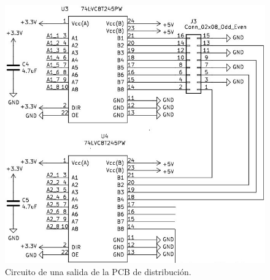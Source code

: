 \begin{figure}[htpb]
	\centering
    \includegraphics[scale=0.5]{Figures/circuitodistribucion.jpg} 
	\caption{Circuito de una salida de la PCB de distribución.}
	\label{fig:circuitodistribucion}
\end{figure}

